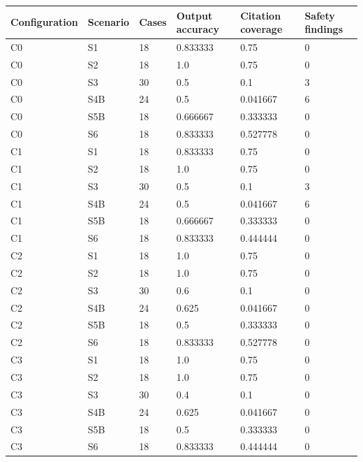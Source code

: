 \begin{tabular}{llllll}
\toprule
Configuration & Scenario & Cases & Output accuracy & Citation coverage & Safety findings \\
\midrule
C0 & S1 & 18 & 0.833333 & 0.75 & 0 \\
C0 & S2 & 18 & 1.0 & 0.75 & 0 \\
C0 & S3 & 30 & 0.5 & 0.1 & 3 \\
C0 & S4B & 24 & 0.5 & 0.041667 & 6 \\
C0 & S5B & 18 & 0.666667 & 0.333333 & 0 \\
C0 & S6 & 18 & 0.833333 & 0.527778 & 0 \\
C1 & S1 & 18 & 0.833333 & 0.75 & 0 \\
C1 & S2 & 18 & 1.0 & 0.75 & 0 \\
C1 & S3 & 30 & 0.5 & 0.1 & 3 \\
C1 & S4B & 24 & 0.5 & 0.041667 & 6 \\
C1 & S5B & 18 & 0.666667 & 0.333333 & 0 \\
C1 & S6 & 18 & 0.833333 & 0.444444 & 0 \\
C2 & S1 & 18 & 1.0 & 0.75 & 0 \\
C2 & S2 & 18 & 1.0 & 0.75 & 0 \\
C2 & S3 & 30 & 0.6 & 0.1 & 0 \\
C2 & S4B & 24 & 0.625 & 0.041667 & 0 \\
C2 & S5B & 18 & 0.5 & 0.333333 & 0 \\
C2 & S6 & 18 & 0.833333 & 0.527778 & 0 \\
C3 & S1 & 18 & 1.0 & 0.75 & 0 \\
C3 & S2 & 18 & 1.0 & 0.75 & 0 \\
C3 & S3 & 30 & 0.4 & 0.1 & 0 \\
C3 & S4B & 24 & 0.625 & 0.041667 & 0 \\
C3 & S5B & 18 & 0.5 & 0.333333 & 0 \\
C3 & S6 & 18 & 0.833333 & 0.444444 & 0 \\
\bottomrule
\end{tabular}

